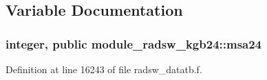 \subsection{Variable Documentation}
\subsubsection[{\texorpdfstring{msa24}{msa24}}]{\setlength{\rightskip}{0pt plus 5cm}integer, public module\+\_\+radsw\+\_\+kgb24\+::msa24}\hypertarget{namespacemodule__radsw__kgb24_ad416df05aed8a6ae1ecd57d5c90c223c}{}\label{namespacemodule__radsw__kgb24_ad416df05aed8a6ae1ecd57d5c90c223c}


Definition at line 16243 of file radsw\+\_\+datatb.\+f.

